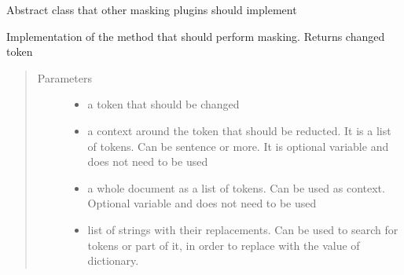\documentclass[letterpaper,10pt,english]{sphinxmanual}
\begin{document}
\begin{fulllineitems}
\label{\detokenize{contents:masking_plugins.Mask_abstract.Mask_abstract}}
Abstract class that other masking plugins should implement

\begin{fulllineitems}
\label{\detokenize{contents:masking_plugins.Mask_abstract.Mask_abstract.mask}}
Implementation of the method that should perform masking. Returns changed token
\begin{quote}\begin{description}
\item[{Parameters}] \leavevmode\begin{itemize}
\item {} 
 \textendash{} a token that should be changed

\item {} 
 \textendash{} a context around the token that should be reducted. It is a list of tokens. Can be sentence or more. It is optional variable and does not need to be used

\item {} 
 \textendash{} a whole document as a list of tokens. Can be used as context. Optional variable and does not need to be used

\item {} 
 \textendash{} list of strings with their replacements. Can be used to search for tokens or part of it, in order to replace with the value of dictionary.

\end{itemize}

\end{description}\end{quote}

\end{fulllineitems}


\end{fulllineitems}
\end{document}
